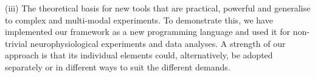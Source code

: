 (iii) The theoretical basis for new tools that are practical, powerful
and generalise to complex and multi-modal experiments. To demonstrate
this, we have implemented our framework as a new programming language
and used it for non-trivial neurophysiological experiments and data
analyses. A strength of our approach is that its individual elements
could, alternatively, be adopted separately or in different ways to
suit the different demands.
